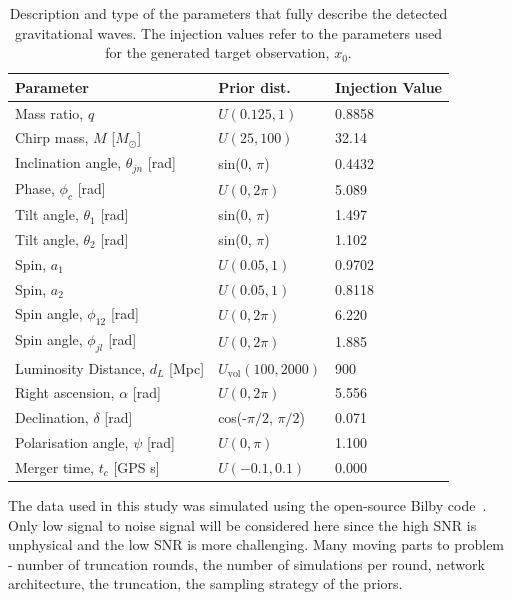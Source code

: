 \begin{table}[htb]
\centering
\begin{tabular}{|l|l|l|}
\hline
\textbf{Parameter} & \textbf{Prior dist.} & \textbf{Injection Value} \\
\hline
Mass ratio, \( q \) & \( U(0.125, 1) \) & 0.8858 \\
Chirp mass, \( M \) [\( M_{\odot} \)] & \( U(25, 100) \) & 32.14 \\
Inclination angle, \( \theta_{jn} \) [rad] & sin(0, \( \pi \)) & 0.4432 \\
Phase, \( \phi_c \) [rad] & \( U(0, 2\pi) \) & 5.089 \\
Tilt angle, \( \theta_1 \) [rad] & sin(0, \( \pi \)) & 1.497 \\
Tilt angle, \( \theta_2 \) [rad] & sin(0, \( \pi \)) & 1.102 \\
Spin, \( a_1 \) & \( U(0.05, 1) \) & 0.9702 \\
Spin, \( a_2 \) & \( U(0.05, 1) \) & 0.8118 \\
Spin angle, \( \phi_{12} \) [rad] & \( U(0, 2\pi) \) & 6.220 \\
Spin angle, \( \phi_{jl} \) [rad] & \( U(0, 2\pi) \) & 1.885 \\
Luminosity Distance, \( d_L \) [Mpc] & \( U_{\text{vol}}(100, 2000) \) & 900 \\
Right ascension, \( \alpha \) [rad] & \( U(0, 2\pi) \) & 5.556 \\
Declination, \( \delta \) [rad] & cos(-\( \pi/2 \), \( \pi/2 \)) & 0.071 \\
Polarisation angle, \( \psi \) [rad] & \( U(0, \pi) \) & 1.100 \\
Merger time, \( t_c \) [GPS s] & \( U(-0.1, 0.1) \) & 0.000 \\
\hline
\end{tabular}
\caption{Description and type of the parameters that fully describe the detected gravitational waves. The injection values refer to the parameters used for the generated target observation, $x_0$.}
\label{tab:gw_parameters}
\end{table}

The data used in this study was simulated using the open-source Bilby code~\cite{Ashton_Bilby_2019}.
Only low signal to noise signal will be considered here since the high SNR is unphysical and the low SNR is more challenging. Many moving parts to problem - number of truncation rounds, the number of simulations per round, network architecture, the truncation, the sampling strategy of the priors.

